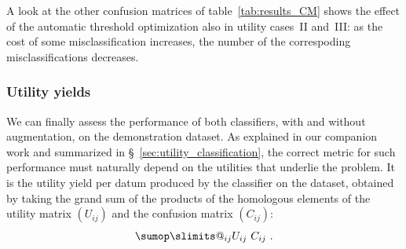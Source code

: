 \documentclass[\ifafour a4paper,12pt,\else a5paper,10pt,\fi%
onecolumn,oneside,article,%
british%
]{memoir}
\makeatletter
\theoremstyle{remark}
\theoremstyle{innote}
\def\sum{\DOTSI\sumop\slimits@}
\renewcommand*{\|}[1][]{\nonscript\:#1\vert\nonscript\:\mathopen{}}
\newcommand*{\sect}{\S}%
\makeatother
\begin{document}
\medskip

A look at the other confusion matrices of table~\ref{tab:results_CM} shows the effect of the automatic threshold optimization also in utility cases~II and~III: as the cost of some misclassification increases, the number of the correspoding misclassifications decreases.


\subsubsection{Utility yields}

We can finally assess the performance of both classifiers, with and without augmentation, on the demonstration dataset. As explained in our companion work \autocites{dyrlandetal2022} and summarized in \sect~\ref{sec:utility_classification}, the correct metric for such performance must naturally depend on the utilities that underlie the problem. It is the utility yield per datum produced by the classifier on the dataset, obtained by taking the grand sum of the products of the homologous elements of the utility matrix $(U_{ij})$ and the confusion matrix $(C_{ij})$:
\begin{equation}
  \label{eq:performance_metric}
  \sum_{ij} U_{ij}\ C_{ij} \ .
\end{equation}





\end{document}
